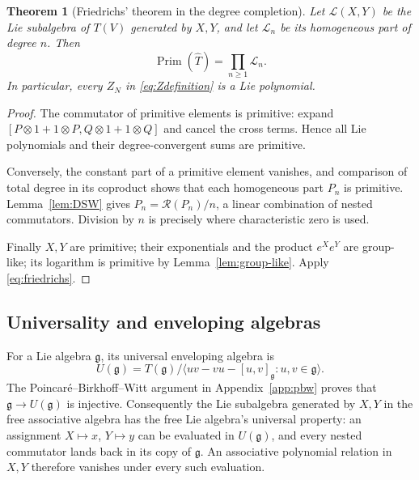 \documentclass[11pt]{article}
\newtheorem{theorem}{Theorem}[section]
\theoremstyle{definition}
\theoremstyle{remark}
\newcommand{\g}{\mathfrak g}
\newcommand{\Lie}{\mathcal L}
\newcommand{\Rbr}{\mathcal R}
\numberwithin{equation}{section}
\begin{document}
\begin{theorem}[Friedrichs' theorem in the degree completion]\label{thm:friedrichs}
Let $\Lie(X,Y)$ be the Lie subalgebra of $T(V)$ generated by $X,Y$, and let $\Lie_n$ be its homogeneous part of degree $n$. Then
\begin{equation}\label{eq:friedrichs}
 \operatorname{Prim}(\widehat T)=\prod_{n\geq1}\Lie_n.
\end{equation}
In particular, every $Z_N$ in \eqref{eq:Zdefinition} is a Lie polynomial.
\end{theorem}
\begin{proof}
The commutator of primitive elements is primitive: expand
$[P\otimes1+1\otimes P,Q\otimes1+1\otimes Q]$ and cancel the cross terms. Hence all Lie polynomials and their degree-convergent sums are primitive.

Conversely, the constant part of a primitive element vanishes, and comparison of total degree in its coproduct shows that each homogeneous part $P_n$ is primitive. Lemma~\ref{lem:DSW} gives $P_n=\Rbr(P_n)/n$, a linear combination of nested commutators. Division by $n$ is precisely where characteristic zero is used.

Finally $X,Y$ are primitive; their exponentials and the product $e^Xe^Y$ are group-like; its logarithm is primitive by Lemma~\ref{lem:group-like}. Apply \eqref{eq:friedrichs}.
\end{proof}

\subsection{Universality and enveloping algebras}\label{subsec:universal}
For a Lie algebra $\g$, its universal enveloping algebra is
\[
 U(\g)=T(\g)/\langle uv-vu-[u,v]_{\g}:u,v\in\g\rangle.
\]
The Poincar\'e--Birkhoff--Witt argument in Appendix~\ref{app:pbw} proves that $\g\to U(\g)$ is injective. Consequently the Lie subalgebra generated by $X,Y$ in the free associative algebra has the free Lie algebra's universal property: an assignment $X\mapsto x$, $Y\mapsto y$ can be evaluated in $U(\g)$, and every nested commutator lands back in its copy of $\g$. An associative polynomial relation in $X,Y$ therefore vanishes under every such evaluation.
\end{document}

